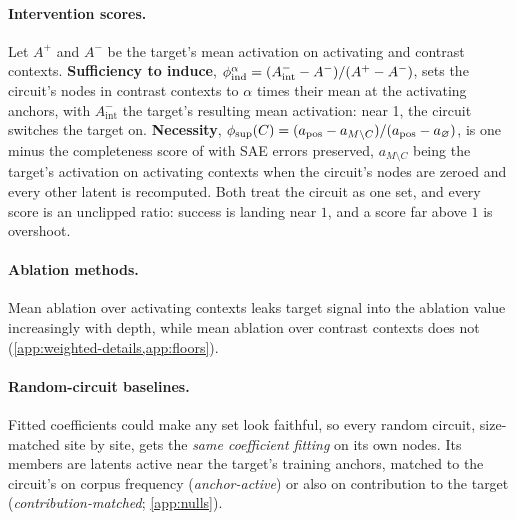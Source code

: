 \documentclass[10pt]{article}
\begin{document}
\paragraph{Intervention scores.}
Let $A^{+}$ and $A^{-}$ be the target's mean activation on activating and contrast contexts.
\textbf{Sufficiency to induce}, $\phi_{\mathrm{ind}}^{\alpha} = (A^{-}_{\mathrm{int}} - A^{-})/(A^{+} - A^{-})$, sets the circuit's nodes in contrast contexts to $\alpha$ times their mean at the activating anchors, with $A^{-}_{\mathrm{int}}$ the target's resulting mean activation: near 1, the circuit switches the target on.
\textbf{Necessity}, $\phi_{\mathrm{sup}}(C) = (a_{\mathrm{pos}} - a_{M \setminus C})/(a_{\mathrm{pos}} - a_{\varnothing})$, is one minus the completeness score of \citet{marks2025sparse} with SAE errors preserved, $a_{M \setminus C}$ being the target's activation on activating contexts when the circuit's nodes are zeroed and every other latent is recomputed.
Both treat the circuit as one set, and every score is an unclipped ratio: success is landing near $1$, and a score far above $1$ is overshoot.

\paragraph{Ablation methods.}
Mean ablation over activating contexts leaks target signal into the ablation value increasingly with depth, while mean ablation over contrast contexts does not (\cref{app:weighted-details,app:floors}).

\paragraph{Random-circuit baselines.}
Fitted coefficients could make any set look faithful, so every random circuit, size-matched site by site, gets the \emph{same coefficient fitting} on its own nodes.
Its members are latents active near the target's training anchors, matched to the circuit's on corpus frequency (\emph{anchor-active}) or also on contribution to the target (\emph{contribution-matched}; \cref{app:nulls}).
\end{document}
